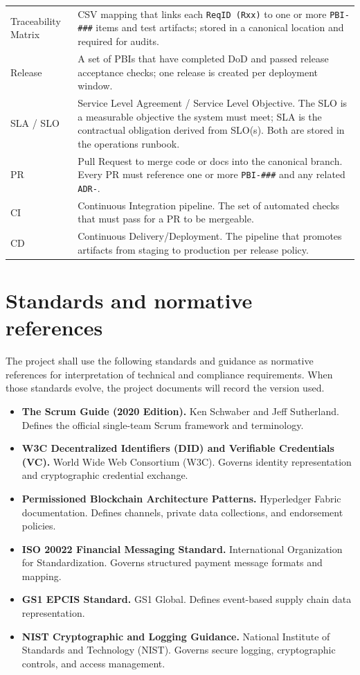 \documentclass[11pt,a4paper]{article}
\begin{document}
\begin{longtable}{p{} p{}}
Traceability Matrix & CSV mapping that links each \texttt{ReqID (Rxx)} to one or more \texttt{PBI-\#\#\#} items and test artifacts; stored in a canonical location and required for audits. \\
Release & A set of PBIs that have completed DoD and passed release acceptance checks; one release is created per deployment window. \\
SLA / SLO & Service Level Agreement / Service Level Objective. The SLO is a measurable objective the system must meet; SLA is the contractual obligation derived from SLO(s). Both are stored in the operations runbook. \\
PR & Pull Request to merge code or docs into the canonical branch. Every PR must reference one or more \texttt{PBI-\#\#\#} and any related \texttt{ADR-}. \\
CI & Continuous Integration pipeline. The set of automated checks that must pass for a PR to be mergeable. \\
CD & Continuous Delivery/Deployment. The pipeline that promotes artifacts from staging to production per release policy. \\
\bottomrule
\end{longtable}

\section{Standards and normative references}
The project shall use the following standards and guidance as normative references for interpretation of technical and compliance requirements. When those standards evolve, the project documents will record the version used.

\begin{itemize}[noitemsep]
  \item \textbf{The Scrum Guide (2020 Edition).} 
  Ken Schwaber and Jeff Sutherland. 
  Defines the official single-team Scrum framework and terminology.
  \item \textbf{W3C Decentralized Identifiers (DID) and Verifiable Credentials (VC).} 
  World Wide Web Consortium (W3C). 
  Governs identity representation and cryptographic credential exchange.
  \item \textbf{Permissioned Blockchain Architecture Patterns.} 
  Hyperledger Fabric documentation. 
  Defines channels, private data collections, and endorsement policies.
  \item \textbf{ISO 20022 Financial Messaging Standard.} 
  International Organization for Standardization. 
  Governs structured payment message formats and mapping.
  \item \textbf{GS1 EPCIS Standard.} 
  GS1 Global. 
  Defines event-based supply chain data representation.
  \item \textbf{NIST Cryptographic and Logging Guidance.} 
  National Institute of Standards and Technology (NIST). 
  Governs secure logging, cryptographic controls, and access management.
\end{itemize}
\end{document}
